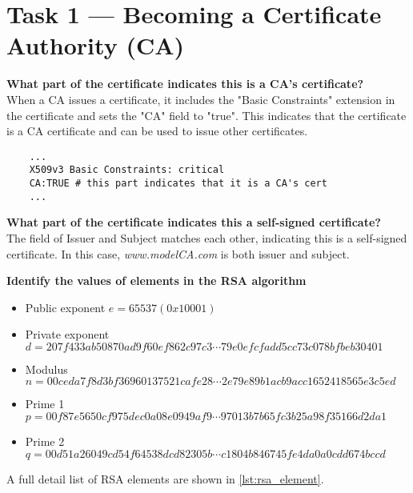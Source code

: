 \section{Task 1 --- Becoming a Certificate Authority (CA)}
%

\textbf{What part of the certificate indicates this is a CA's certificate?}\\
%
When a CA issues a certificate, it includes the "Basic Constraints"
extension in the certificate and sets the "CA" field to "true". This
indicates that the certificate is a CA certificate and can be used to
issue other certificates.

\begin{verbatim}
    ...
    X509v3 Basic Constraints: critical
    CA:TRUE # this part indicates that it is a CA's cert
    ...
\end{verbatim}

\textbf{What part of the certificate indicates this a self-signed
certificate?}\\
%
The field of {\selectfont Issuer} and {\selectfont
Subject} matches each other, indicating this is a self-signed certificate.
In this case, \emph{www.modelCA.com} is both issuer and subject.

\textbf{Identify the values of elements in the RSA algorithm}\\
%
\begin{itemize}
    \item Public exponent \(e = 65537 (0x10001)\)
    \item Private exponent \(d = 207f433ab50870ad9f60ef862c97c3 \cdots
    79e0efcfadd5cc73c078bfbeb30401\)
    \item Modulus \(n = 00ceda7f8d3bf36960137521cafe28 \cdots
    2e79e89b1acb9acc1652418565e3c5ed\)
    \item Prime 1 \(p = 00f87e5650cf975dec0a08e0949af9 \cdots
    97013b7b65fc3b25a98f35166d2da1\)
    \item Prime 2 \(q = 00d51a26049cd54f64538dcd82305b \cdots
    c1804b846745fe4da0a0cdd674bccd\)
\end{itemize}

A full detail list of RSA elements are shown in \autoref{lst:rsa_element}.